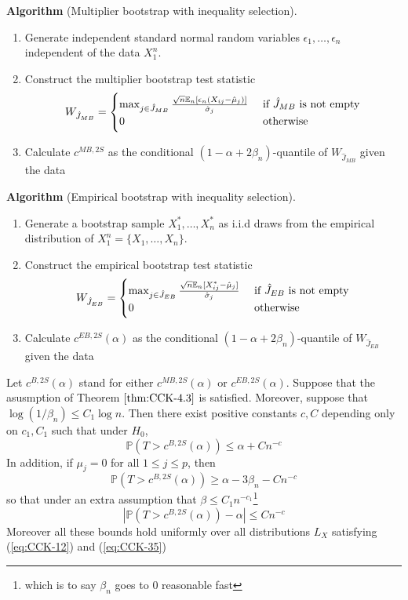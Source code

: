 \textbf{Algorithm} (Multiplier bootstrap with inequality selection).
\begin{enumerate}
	\item Generate independent standard normal random variables $\epsilon_1, \dots,\epsilon_n$ independent of the data $X_{1}^n$.
	\item Construct the multiplier bootstrap test statistic 
	\[W_{\hat{J}_{MB}} = \begin{cases}
	\max_{j \in \hat{J}_{MB}} \frac{\sqrt{n}\mathbb{E}_n[\epsilon_n(X_{ij} - \hat{\mu}_j)]}{\hat{\sigma}_j} & \text{ if $\hat{J}_{MB}$ is not empty} \\
	0 & \text{ otherwise}	
	\end{cases}\]
	\item Calculate $c^{MB, 2S}$ as the conditional $(1-\alpha + 2\beta_n)$-quantile of $W_{\hat{J}_{MB}}$ given the data
\end{enumerate}

\textbf{Algorithm} (Empirical bootstrap with inequality selection).
\begin{enumerate}
	\item Generate a bootstrap sample $X_1^*, \dots, X_n^*$ as i.i.d draws from the empirical distribution of $X_1^n = \{X_1, \dots, X_n\}$.
	\item Construct the empirical bootstrap test statistic 
	\[W_{\hat{J}_{EB}} = \begin{cases}
	\max_{j \in \hat{J}_{EB}} \frac{\sqrt{n}\mathbb{E}_n[X_{ij}^* - \hat{\mu}_j]}{\hat{\sigma}_j} & \text{ if $\hat{J}_{EB}$ is not empty} \\
	0 & \text{ otherwise}	
	\end{cases}\]
	\item Calculate $c^{EB,2S}(\alpha)$ as the conditional $(1-\alpha + 2\beta_n)$-quantile of $W_{\hat{J}_{EB}}$ given the data
\end{enumerate}

\begin{theorem}
	\label{thm:CCK-4.4}
	Let $c^{B,2S}(\alpha)$ stand for either $c^{MB,2S}(\alpha)$	or $c^{EB,2S}(\alpha)$. Suppose that the asusmption of Theorem $\ref{thm:CCK-4.3}$ is satisfied. Moreover, suppose that $\log(1/\beta_n) \leq C_1 \log n$. Then there exist positive constants $c,C$ depending only on $c_1,C_1$ such that under $H_0$,
	\[\mathbb{P}(T > c^{B,2S}(\alpha)) \leq \alpha + Cn^{-c}\]
	In addition, if $\mu_j = 0$ for all $1 \leq j \leq p$, then 
	\[\mathbb{P}(T > c^{B, 2S}(\alpha)) \geq \alpha - 3 \beta_n - Cn^{-c}\]
	so that under an extra assumption that $\beta \leq C_1 n^{-c_1}$\footnote{which is to say $\beta_n$ goes to 0 reasonable fast} 
	\[\left|\mathbb{P}(T> c^{B,2S}(\alpha)) - \alpha \right| \leq Cn^{-c}\]
	Moreover all these bounds hold uniformly over all distributions $L_X$ satisfying (\ref{eq:CCK-12}) and (\ref{eq:CCK-35})
\end{theorem}

